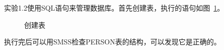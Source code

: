 \documentclass[a4paper,twoside]{article}
\begin{document}
\begin{spacing}{1.2}
实验1.2使用SQL语句来管理数据库。首先创建表，执行的语句如图~\ref{fig:sqlcreate}。
\begin{figure}[htbp]
    \centering
    \caption{创建表}
    \label{fig:sqlcreate}
\end{figure}
执行完后可以用SMSS检查PERSON表的结构，可以发现它是正确的。


\end{spacing}
\end{document}
